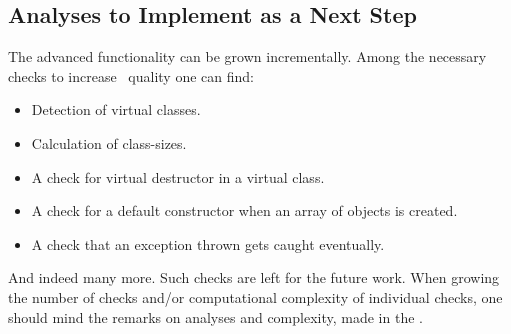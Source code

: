 \subsection{Analyses to Implement as a Next Step}

The advanced  functionality can be grown incrementally. 
Among the necessary checks to increase \pcpp\ quality one can find:
\begin{itemize}
 \item Detection of virtual classes.
 \item Calculation of class-sizes.
 \item A check for virtual destructor in a virtual class.
 \item A check for a default constructor when an array of objects is created.
 \item A check that an exception thrown gets caught eventually.
\end{itemize}

And indeed many more. Such checks are left for the future work. When growing the number of checks and/or 
computational complexity of individual checks, one should mind the remarks on analyses and complexity, made in the 
.


